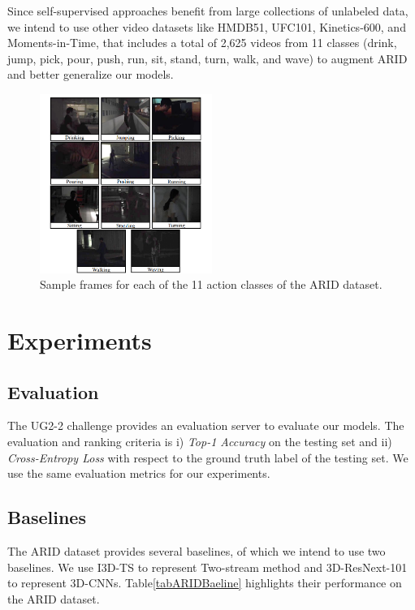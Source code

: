 \documentclass[conference]{IEEEtran}
\begin{document}
Since self-supervised approaches benefit from large collections of unlabeled data, we intend to use other video datasets like HMDB51\cite{Kuehne2011HMDBAL}, UFC101\cite{Soomro2012UCF101AD}, Kinetics-600\cite{Kay2017TheKH}, and Moments-in-Time\cite{Monfort2020MomentsIT}, that includes a total of 2,625 videos from 11 classes (drink, jump, pick, pour, push, run, sit, stand, turn, walk, and wave) to augment ARID and better generalize our models.

\begin{figure}[ht]
\centerline{\includegraphics[width=0.5\textwidth]{arid_dataset_sample.png}}
\caption{Sample frames for each of the 11 action classes of the ARID dataset.}
\label{figARIDSample}
\end{figure}


\section{Experiments}

\subsection{Evaluation}
The UG2-2 challenge provides an evaluation server to evaluate our models. The evaluation and ranking criteria is i) \textit{Top-1 Accuracy} on the testing set and ii) \textit{Cross-Entropy Loss} with respect to the ground truth label of the testing set. We use the same evaluation metrics for our experiments.

\subsection{Baselines}
The ARID dataset provides several baselines, of which we intend to use two baselines. We use I3D-TS\cite{Carreira2017QuoVA} to represent Two-stream method and 3D-ResNext-101\cite{Hara2018CanS3} to represent 3D-CNNs. Table\ref{tabARIDBaeline} highlights their performance on the ARID dataset.
\end{document}
